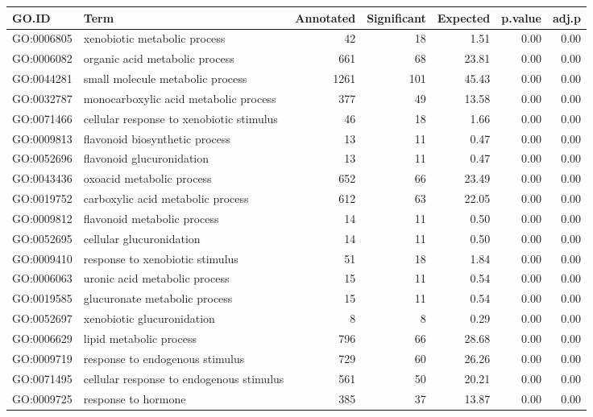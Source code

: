 \begin{table}[ht]
\centering
\begin{tabular}{llrrrrr}
  \hline
GO.ID & Term & Annotated & Significant & Expected & p.value & adj.p \\ 
  \hline
GO:0006805 & xenobiotic metabolic process &  42 &  18 & 1.51 & 0.00 & 0.00 \\ 
  GO:0006082 & organic acid metabolic process & 661 &  68 & 23.81 & 0.00 & 0.00 \\ 
  GO:0044281 & small molecule metabolic process & 1261 & 101 & 45.43 & 0.00 & 0.00 \\ 
  GO:0032787 & monocarboxylic acid metabolic process & 377 &  49 & 13.58 & 0.00 & 0.00 \\ 
  GO:0071466 & cellular response to xenobiotic stimulus &  46 &  18 & 1.66 & 0.00 & 0.00 \\ 
  GO:0009813 & flavonoid biosynthetic process &  13 &  11 & 0.47 & 0.00 & 0.00 \\ 
  GO:0052696 & flavonoid glucuronidation &  13 &  11 & 0.47 & 0.00 & 0.00 \\ 
  GO:0043436 & oxoacid metabolic process & 652 &  66 & 23.49 & 0.00 & 0.00 \\ 
  GO:0019752 & carboxylic acid metabolic process & 612 &  63 & 22.05 & 0.00 & 0.00 \\ 
  GO:0009812 & flavonoid metabolic process &  14 &  11 & 0.50 & 0.00 & 0.00 \\ 
  GO:0052695 & cellular glucuronidation &  14 &  11 & 0.50 & 0.00 & 0.00 \\ 
  GO:0009410 & response to xenobiotic stimulus &  51 &  18 & 1.84 & 0.00 & 0.00 \\ 
  GO:0006063 & uronic acid metabolic process &  15 &  11 & 0.54 & 0.00 & 0.00 \\ 
  GO:0019585 & glucuronate metabolic process &  15 &  11 & 0.54 & 0.00 & 0.00 \\ 
  GO:0052697 & xenobiotic glucuronidation &   8 &   8 & 0.29 & 0.00 & 0.00 \\ 
  GO:0006629 & lipid metabolic process & 796 &  66 & 28.68 & 0.00 & 0.00 \\ 
  GO:0009719 & response to endogenous stimulus & 729 &  60 & 26.26 & 0.00 & 0.00 \\ 
  GO:0071495 & cellular response to endogenous stimulus & 561 &  50 & 20.21 & 0.00 & 0.00 \\ 
  GO:0009725 & response to hormone & 385 &  37 & 13.87 & 0.00 & 0.00 \\ 

\end{tabular}
\end{table}
